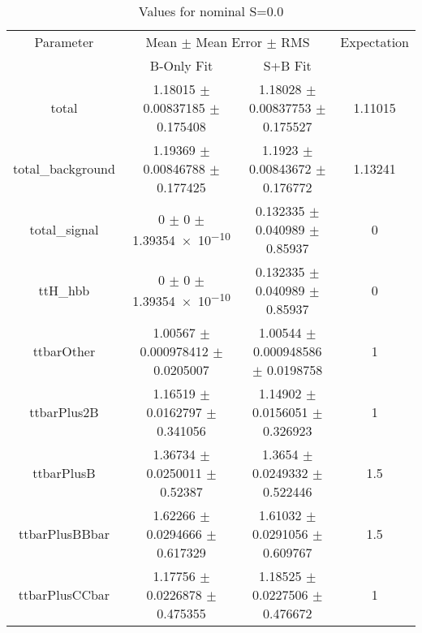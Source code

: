 \begin{table}
\centering
\caption{Values for nominal S=0.0}
\begin{tabular}{cccc}
\toprule
Parameter & \multicolumn{2}{c}{Mean $\pm$ Mean Error $\pm$ RMS} & Expectation\\
 & B-Only Fit & S+B Fit & \\
\midrule
total & \num{1.18015} $\pm$ \num{0.00837185} $\pm$ \num{0.175408} & \num{1.18028} $\pm$ \num{0.00837753} $\pm$ \num{0.175527} & \num{1.11015}\\
total\_background & \num{1.19369} $\pm$ \num{0.00846788} $\pm$ \num{0.177425} & \num{1.1923} $\pm$ \num{0.00843672} $\pm$ \num{0.176772} & \num{1.13241}\\
total\_signal & \num{0} $\pm$ \num{0} $\pm$ \num{1.39354e-10} & \num{0.132335} $\pm$ \num{0.040989} $\pm$ \num{0.85937} & \num{0}\\
ttH\_hbb & \num{0} $\pm$ \num{0} $\pm$ \num{1.39354e-10} & \num{0.132335} $\pm$ \num{0.040989} $\pm$ \num{0.85937} & \num{0}\\
ttbarOther & \num{1.00567} $\pm$ \num{0.000978412} $\pm$ \num{0.0205007} & \num{1.00544} $\pm$ \num{0.000948586} $\pm$ \num{0.0198758} & \num{1}\\
ttbarPlus2B & \num{1.16519} $\pm$ \num{0.0162797} $\pm$ \num{0.341056} & \num{1.14902} $\pm$ \num{0.0156051} $\pm$ \num{0.326923} & \num{1}\\
ttbarPlusB & \num{1.36734} $\pm$ \num{0.0250011} $\pm$ \num{0.52387} & \num{1.3654} $\pm$ \num{0.0249332} $\pm$ \num{0.522446} & \num{1.5}\\
ttbarPlusBBbar & \num{1.62266} $\pm$ \num{0.0294666} $\pm$ \num{0.617329} & \num{1.61032} $\pm$ \num{0.0291056} $\pm$ \num{0.609767} & \num{1.5}\\
ttbarPlusCCbar & \num{1.17756} $\pm$ \num{0.0226878} $\pm$ \num{0.475355} & \num{1.18525} $\pm$ \num{0.0227506} $\pm$ \num{0.476672} & \num{1}\\
\bottomrule
\end{tabular}
\end{table}